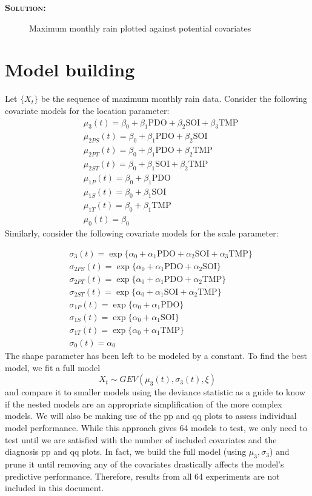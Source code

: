 \documentclass[12pt,oneside]{article}
\newenvironment{solution}
    {\textbf{\textsc{Solution:}}\\}
    {\newpage}
\begin{document}
\begin{solution}
\begin{figure}[H]
\begin{center}
\caption{Maximum monthly rain plotted against potential covariates }
\end{center}
\end{figure}

\section*{Model building}
Let $\{X_t\}$ be the sequence of maximum monthly rain data. Consider the following covariate models for the location parameter:
\begin{align*}
    & \mu_3(t)=\beta_0+\beta_1\text{PDO}+\beta_2\text{SOI}+ \beta_3\text{TMP}\\
    & \mu_{2PS}(t)=\beta_0+\beta_1\text{PDO}+\beta_2\text{SOI}\\
    & \mu_{2PT}(t)=\beta_0+\beta_1\text{PDO}+\beta_2\text{TMP}\\
    & \mu_{2ST}(t)=\beta_0+\beta_1\text{SOI}+ \beta_2\text{TMP}\\
    & \mu_{1P}(t)=\beta_0+\beta_1\text{PDO}\\
    & \mu_{1S}(t)=\beta_0+\beta_1\text{SOI}\\
    & \mu_{1T}(t)=\beta_0+\beta_1\text{TMP}\\
    & \mu_0(t)=\beta_0
\end{align*}
Similarly, consider the following covariate models for the scale parameter:

\begin{align*}
    & \sigma_3(t)=\exp\{\alpha_0+\alpha_1\text{PDO}+\alpha_2\text{SOI}+ \alpha_3\text{TMP}\}\\
    & \sigma_{2PS}(t)=\exp\{\alpha_0+\alpha_1\text{PDO}+\alpha_2\text{SOI}\}\\
    & \sigma_{2PT}(t)=\exp\{\alpha_0+\alpha_1\text{PDO}+\alpha_2\text{TMP}\}\\
    & \sigma_{2ST}(t)=\exp\{\alpha_0+\alpha_1\text{SOI}+ \alpha_2\text{TMP}\}\\
    & \sigma_{1P}(t)=\exp\{\alpha_0+\alpha_1\text{PDO}\}\\
    & \sigma_{1S}(t)=\exp\{\alpha_0+\alpha_1\text{SOI}\}\\
    & \sigma_{1T}(t)=\exp\{\alpha_0+\alpha_1\text{TMP}\}\\
    & \sigma_0(t)=\alpha_0
\end{align*}
The shape parameter has been left to be modeled by a constant. To find the best model, we fit a full model
\[X_t\sim GEV(\mu_3(t),\sigma_3(t), \xi) \]
and compare it to smaller models using the deviance statistic as a guide to know if the nested models are an appropriate simplification of the more complex models. We will also be making use of the pp and qq plots to assess individual model performance. While this approach gives 64 models to test, we only need to test until we are satisfied with the number of included covariates and the diagnosis pp and qq plots. In fact, we build the full model (using $\mu_3, \sigma_3$) and prune it until removing any of the covariates drastically affects the model's predictive performance. Therefore, results from all 64 experiments are not included in this document.


\end{solution}
\end{document}
